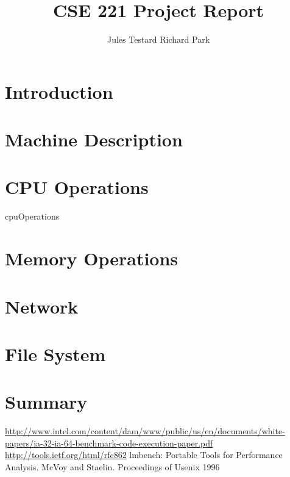 \documentclass[11pt,twocolumn]{article}
\begin{document}
\title{CSE 221 Project Report}
\author{Jules Testard \quad Richard Park}
\maketitle

\section{Introduction}



\section{Machine Description}



\section{CPU Operations}

 {cpuOperations}

\section{Memory Operations}



\section{Network}



\section{File System}



\section{Summary}



\begin{thebibliography}{9}
    \url{http://www.intel.com/content/dam/www/public/us/en/documents/white-papers/ia-32-ia-64-benchmark-code-execution-paper.pdf}
    \url{http://tools.ietf.org/html/rfc862}
    lmbench: Portable Tools for Performance Analysis. McVoy and Staelin. Proceedings of Usenix 1996
\end{thebibliography}
\end{document}
